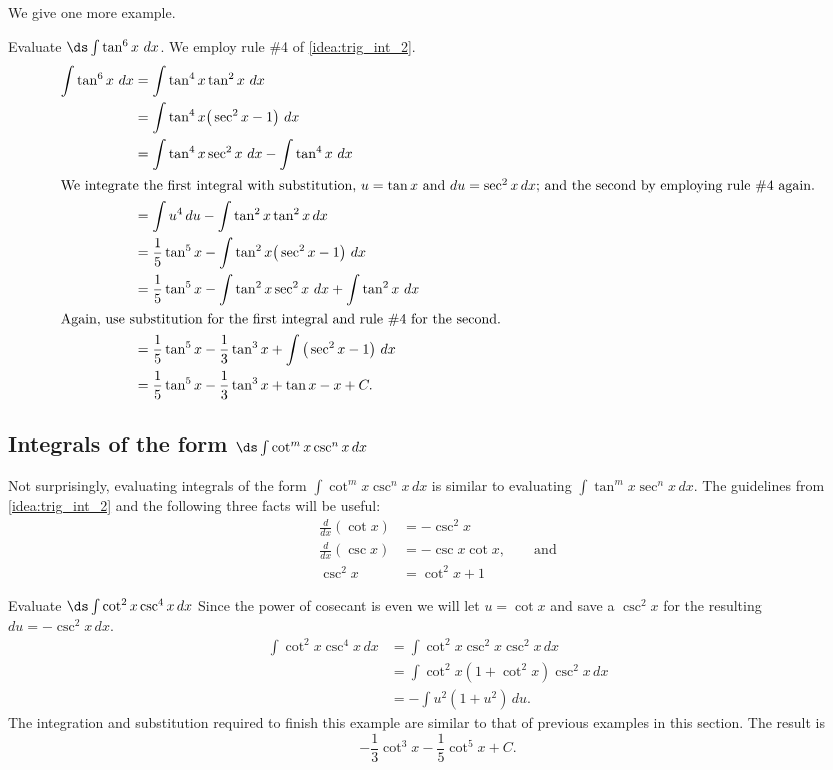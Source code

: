 We give one more example.

\begin{example}\label{ex_trigint7}
Evaluate $\ds\int\tan^6x\ dx$.
\solution
We employ rule \#4 of \autoref{idea:trig_int_2}. 
\begin{align*}
	\int \tan^6x\ dx
	&= \int \tan^4x\tan^2x\ dx \\
	&= \int\tan^4x\big(\sec^2x-1\big)\ dx\\
	&= \int\tan^4x\sec^2x\ dx - \int\tan^4x\ dx \\
\intertext{We integrate the first integral with substitution, $u=\tan x$ and $du=\sec^2x\,dx$; and the second by employing rule \#4 again.}
	&= \int u^4\, du-\int\tan^2 x\tan^2 x\, dx \\
	&=	\frac15\tan^5x-\int\tan^2x\big(\sec^2x-1\big)\ dx \\
	&= \frac15\tan^5x -\int\tan^2x\sec^2x\ dx + \int\tan^2x\ dx\\
\intertext{Again, use substitution for the first integral and rule \#4 for the second.}
	&= \frac15\tan^5x-\frac13\tan^3x+\int\big(\sec^2x-1\big)\ dx \\
	&=	 \frac15\tan^5x-\frac13\tan^3x+\tan x - x+C.
\end{align*}
\end{example}

\subsection{\texorpdfstring{Integrals of the form $\ds\int\cot^mx\csc^nx\,dx$}{Integrands of the form (cot x)\^{}m (csc x)\^{}n}}

Not surprisingly, evaluating integrals of the form $\int\cot^mx\csc^nx\,dx$ is similar to evaluating $\int\tan^mx\sec^nx\,dx$. The guidelines from \autoref{idea:trig_int_2} and the following three facts will be useful:
\begin{align*}
 \frac{d}{dx}(\cot x) &= -\csc^2x \\
 \frac{d}{dx}(\csc x) &= -\csc x\cot x,\qquad\text{and} \\
 \csc^2 x &= \cot^2x+1
\end{align*}

\begin{example}\label{ex_int_cot_csc}
Evaluate $\ds\int\cot^2x\csc^4x\,dx$
\solution
Since the power of cosecant is even we will let $u=\cot x$ and save a $\csc^2x$ for the resulting $du=-\csc^2x\,dx$.
\begin{align*}
 \int\cot^2x\csc^4x\,dx
 &=\int\cot^2x\csc^2x\csc^2x\,dx \\
 &=\int\cot^2x(1+\cot^2x)\csc^2x\,dx \\
 &=-\int u^2(1+u^2)\,du.
\end{align*}
The integration and substitution required to finish this example are similar to that of previous examples in this section. The result is
\[-\frac13\cot^3x-\frac15\cot^5x+C.\]
\end{example}

